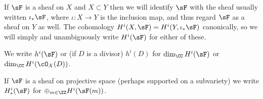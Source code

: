 If $\sF$ is a sheaf on $X$ and $X\subset Y$ then we will identify $\sF$ with
the sheaf usually written $\iota_*\sF$, where $\iota:X\to Y$ is the inclusion map,
 and thus regard $\sF$ as a sheaf on $Y$ as well.
The cohomology  $H^i(X, \sF) = H^i(Y,\iota_*\sF)$ canonically, so we will
simply and unambiguously write $H^i(\sF)$ for either of these. 

We write $h^i(\sF)$ or (if $D$ is a divisor) $h^{i}(D)$ for 
%
$\dim_{\CC}H^i(\sF)$ or $\dim_{\CC}H^i(\cO_X(D))$. 

If $\sF$ is a sheaf on projective space (perhaps supported on a subvariety) we write $H^i_*(\sF)$ for
%
$\oplus_{m\in \ZZ} H^i(\sF(m))$. 





